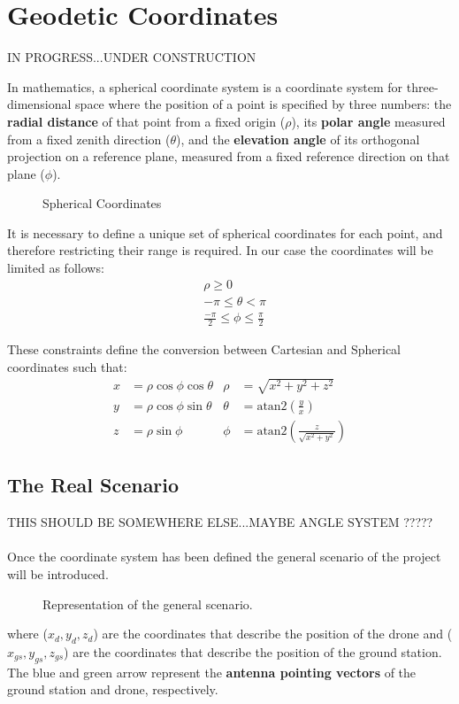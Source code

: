 \section{Geodetic Coordinates}\label{sec:coord}
IN PROGRESS...UNDER CONSTRUCTION

In mathematics, a spherical coordinate system is a coordinate system for three-dimensional space where the position of a point is specified by three numbers: the \textbf{radial distance} of that point from a fixed origin ($\rho$), its \textbf{polar angle} measured from a fixed zenith direction ($\theta$), and the \textbf{elevation angle} of its orthogonal projection on a reference plane, measured from a fixed reference direction on that plane ($\phi$).

\begin{figure}[H]
   \centering
     
    \label{fig:Spherical1}
    \caption{Spherical Coordinates}
\end{figure}

 It is necessary to define a unique set of spherical coordinates for each point, and therefore restricting their range is required. In our case the coordinates will be limited as follows:
\begin{align*}
& \rho \geq 0 \\
& -\pi \leq \theta < \pi \\
& \frac{-\pi}{2} \leq \phi \leq \frac{\pi}{2}
\label{eq:los_distToHorizon}
\end{align*} 

These constraints define the conversion between Cartesian and Spherical coordinates such that:
\begin{align*}
x &=  \rho\cos\phi\cos\theta	&	\rho &= \sqrt{x^{2} + y^{2} + z^{2}} \\
y &= \rho\cos\phi\sin\theta		&	\theta &= \text{atan2}\left(\frac{y}{x}\right)\\
z &= \rho\sin\phi				&	\phi &=  \text{atan2}\left(\frac{z}{\sqrt{x^2 + y^2}}\right)
\label{eq:los_distToHorizon}
\end{align*} 

\subsection{The Real Scenario}
THIS SHOULD BE SOMEWHERE ELSE...MAYBE ANGLE SYSTEM ?????
\paragraph{} Once the coordinate system has been defined the general scenario of the project will be introduced.
\begin{figure}[H]
   \centering
     
    \label{fig:Scenario1}
    \caption{Representation of the general scenario.}
\end{figure}
where ($x_d,y_d,z_d$) are the coordinates that describe the position of the drone and ($x_{gs},y_{gs},z_{gs}$) are the coordinates that describe the position of the ground station.
The blue and green arrow represent the \textbf{antenna pointing vectors} of the ground station and drone, respectively.

